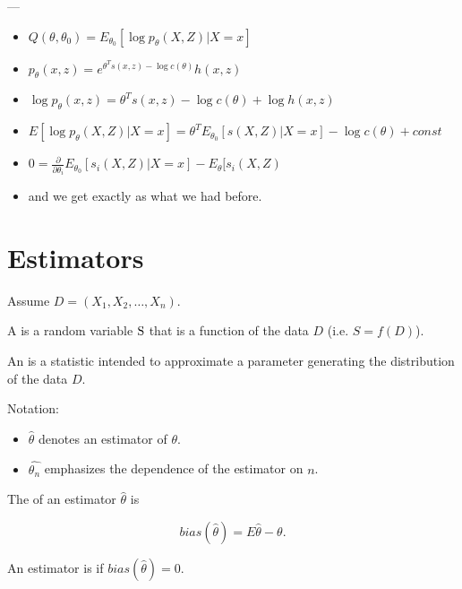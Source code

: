 ---

\begin{itemize}
    \item $Q(\theta, \theta_0) = E_{\theta_0} [ \log p_\theta(X,Z) | X = x]$
    \item $p_\theta(x, z) = e^{\theta^T s(x,z) - \log c(\theta)} h(x,z)$
    \item $\log p_\theta(x, z) = \theta^T s(x,z) - \log c(\theta) + \log h(x,z)$
    \item $E[\log p_\theta(X,Z) | X=x] = \theta^T E_{\theta_0}[s(X, Z) | X=x] - \log c(\theta) + const$
    \item $0 = \frac{\partial}{\partial \theta_i} E_{\theta_0}[s_i(X, Z) | X=x] - E_\theta[s_i(X,Z)$
    \item and we get exactly as what we had before.
\end{itemize}


\section{Estimators}

Assume $D = (X_1, X_2, \dots, X_n)$.

\begin{defn}
    A  is a random variable ${\textnormal{S}}$ that is a function of the data $D$ (i.e. $S = f(D)$).
\end{defn}

\begin{defn}
    An  is a statistic intended to approximate a parameter generating the distribution of the data $D$.
\end{defn}

Notation:

\begin{itemize}
    \item $\hat{\theta}$ denotes an estimator of $\theta$.
    \item $\hat{\theta_n}$ emphasizes the dependence of the estimator on $n$.
\end{itemize}

\begin{defn}
    The  of an estimator $\hat{\theta}$ is
    
    \begin{equation}
        bias(\hat{\theta}) = E \hat{\theta} - \theta.
    \end{equation}
\end{defn}

\begin{defn}
    An estimator is  if $bias(\hat{\theta}) = 0$.
    
\end{defn}

